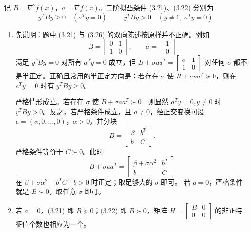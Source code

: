 \documentclass{ctexart}
\begin{document}
\begin{solution}
  记 $B=\nabla^2 f(x)$，$a=\nabla f(x)$。二阶拟凸条件 (3.21)、(3.22) 分别为
  \[
    y^TBy\geq0\quad(a^Ty=0),\qquad
    y^TBy>0\quad(y\neq0,\ a^Ty=0).
  \]
  \begin{enumerate}
    \item 先说明：题中 (3.21) 与 (3.26) 的双向陈述按原样并不正确。例如
      \[
        B=
        \begin{bmatrix}0&1\\1&0
        \end{bmatrix},\qquad a=
        \begin{bmatrix}1\\0
        \end{bmatrix}
      \]
      满足 $y^TBy=0$ 对所有 $a^Ty=0$ 成立，但
      $B+\sigma aa^T=
      \begin{bmatrix}\sigma&1\\1&0
      \end{bmatrix}$ 对任何 $\sigma$
      都不是半正定。正确且常用的半正定方向是：若存在 $\sigma$ 使
      $B+\sigma aa^T\succeq0$，则在 $a^Ty=0$ 时有 $y^TBy\geq0$。

      严格情形成立。若存在 $\sigma$ 使 $B+\sigma aa^T\succ0$，则显然
      $a^Ty=0,y\neq0$ 时 $y^TBy>0$。反之，若严格条件成立，且 $a\neq0$，经正交变换可设
      $a=(\alpha,0,\ldots,0)$，$\alpha>0$，并分块
      \[
        B=
        \begin{bmatrix}\beta&b^T\\b&C
        \end{bmatrix}.
      \]
      严格条件等价于 $C\succ0$。此时
      \[
        B+\sigma aa^T=
        \begin{bmatrix}\beta+\sigma\alpha^2&b^T\\b&C
        \end{bmatrix}
      \]
      在 $\beta+\sigma\alpha^2-b^TC^{-1}b>0$ 时正定；取足够大的 $\sigma$ 即可。
      若 $a=0$，严格条件就是 $B\succ0$，取任意 $\sigma$ 即可。

    \item 若 $a=0$，(3.21) 即 $B\succeq0$；(3.22) 即 $B\succ0$，矩阵
      $H=
      \begin{bmatrix}B&0\\0&0
      \end{bmatrix}$ 的非正特征值个数也相应为一个。


\end{enumerate}
\end{solution}
\end{document}
